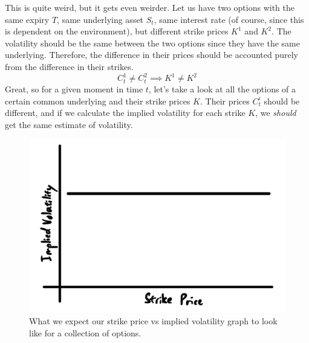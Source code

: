 \documentclass{article}
\begin{document}
    This is quite weird, but it gets even weirder. Let us have two options with the same expiry $T$, same underlying asset $S_t$, same interest rate (of course, since this is dependent on the environment), but different strike prices $K^1$ and $K^2$. The volatility should be the same between the two options since they have the same underlying. Therefore, the difference in their prices should be accounted purely from the difference in their strikes. 
    \begin{equation}
      C_t^1 \neq C_t^2 \implies K^1 \neq K^2
    \end{equation}
    Great, so for a given moment in time $t$, let's take a look at all the options of a certain common underlying and their strike prices $K$. Their prices $C_t^i$ should be different, and if we calculate the implied volatility for each strike $K$, we \textit{should} get the same estimate of volatility. 

    \begin{figure}[H]
      \centering 
      \includegraphics[scale=0.4]{img/expected_vol_graph.png}
      \caption{What we expect our strike price vs implied volatility graph to look like for a collection of options. } 
      \label{fig:expected_volatility_graph}
    \end{figure}
\end{document}

